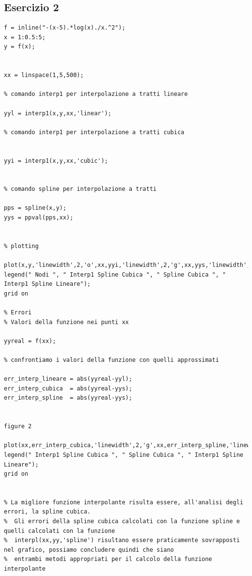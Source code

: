 \documentclass{article}
\begin{document}
\subsection{ Esercizio 2}
\begin{lstlisting}
f = inline("-(x-5).*log(x)./x.^2");
x = 1:0.5:5;
y = f(x);


xx = linspace(1,5,500);

% comando interp1 per interpolazione a tratti lineare

yyl = interp1(x,y,xx,'linear'); 

% comando interp1 per interpolazione a tratti cubica


yyi = interp1(x,y,xx,'cubic');


% comando spline per interpolazione a tratti

pps = spline(x,y);
yys = ppval(pps,xx);


% plotting

plot(x,y,'linewidth',2,'o',xx,yyi,'linewidth',2,'g',xx,yys,'linewidth',2,'r',xx,yyl,'linewidth',2,'b');
legend(" Nodi ", " Interp1 Spline Cubica ", " Spline Cubica ", " Interp1 Spline Lineare");
grid on

% Errori
% Valori della funzione nei punti xx

yyreal = f(xx);

% confrontiamo i valori della funzione con quelli approssimati

err_interp_lineare = abs(yyreal-yyl);
err_interp_cubica  = abs(yyreal-yys);
err_interp_spline  = abs(yyreal-yys);


figure 2 

plot(xx,err_interp_cubica,'linewidth',2,'g',xx,err_interp_spline,'linewidth',2,'o',xx,err_interp_lineare,'linewidth',2,'r');
legend(" Interp1 Spline Cubica ", " Spline Cubica ", " Interp1 Spline Lineare");
grid on


% La migliore funzione interpolante risulta essere, all'analisi degli errori, la spline cubica.
%  Gli errori della spline cubica calcolati con la funzione spline e quelli calcolati con la funzione
%  interpl(xx,yy,'spline') risultano essere praticamente sovrapposti nel grafico, possiamo concludere quindi che siano
%  entrambi metodi appropriati per il calcolo della funzione interpolante 
 

\end{lstlisting}
\end{document}

